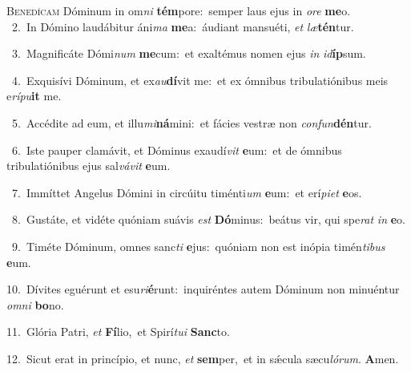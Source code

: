 \lettrine{\initial\textcolor{\initialcolor}{B}}{enedícam} Dóminum in om\textit{ni} \textbf{tém}\-pore:~\star semper laus ejus in \textit{o}\-\textit{re} \textbf{me}\-o.\\
{\numbfont\textcolor{\numbcolor}{~2.}}~In Dómino laudábitur áni\textit{ma} \textbf{me}\-a:~\star áudiant mansuéti, \textit{et} \textit{læ}\-\textbf{tén}tur.\par
{\numbfont\textcolor{\numbcolor}{~3.}}~Magnificáte Dómi\textit{num} \textbf{me}\-cum:~\star et exaltémus nomen ejus \textit{in} \textit{id}\-\textbf{íp}sum.\par
{\numbfont\textcolor{\numbcolor}{~4.}}~Exquisívi Dóminum, et ex\-\textit{au}\-\textbf{dí}vit me:~\star et ex ómnibus tribulatiónibus meis e\-\textit{rí}\-\textit{pu}\textbf{it} me.\par
{\numbfont\textcolor{\numbcolor}{~5.}}~Accédite ad eum, et illu\-\textit{mi}\-\textbf{ná}mini:~\star et fácies vestræ non \textit{con}\-\textit{fun}\textbf{dén}tur.\par
{\numbfont\textcolor{\numbcolor}{~6.}}~Iste pauper clamávit, et Dóminus exaudí\textit{vit} \textbf{e}\-um:~\star et de ómnibus tribulatiónibus ejus sal\-\textit{vá}\-\textit{vit} \textbf{e}\-um.\par
{\numbfont\textcolor{\numbcolor}{~7.}}~Immíttet Angelus Dómini in circúitu timénti\textit{um} \textbf{e}\-um:~\star et erí\-\textit{pi}\-\textit{et} \textbf{e}\-os.\par
{\numbfont\textcolor{\numbcolor}{~8.}}~Gustáte, et vidéte quóniam suávis \textit{est} \textbf{Dó}\-minus:~\star beátus vir, qui spe\textit{rat} \textit{in} \textbf{e}\-o.\par
{\numbfont\textcolor{\numbcolor}{~9.}}~Timéte Dóminum, omnes sanc\textit{ti} \textbf{e}\-jus:~\star quóniam non est inópia timén\-\textit{ti}\-\textit{bus} \textbf{e}\-um.\par
{\numbfont\textcolor{\numbcolor}{10.}}~Dívites eguérunt et esu\-\textit{ri}\-\textbf{é}runt:~\star inquiréntes autem Dóminum non minuéntur \textit{om}\-\textit{ni} \textbf{bo}\-no.\par
{\numbfont\textcolor{\numbcolor}{11.}}~Glória Patri, \textit{et} \textbf{Fí}\-lio,~\star et Spirí\-\textit{tu}\-\textit{i} \textbf{Sanc}\-to.\par
{\numbfont\textcolor{\numbcolor}{12.}}~Sicut erat in princípio, et nunc, \textit{et} \textbf{sem}\-per,~\star et in sǽcula sæcu\-\textit{ló}\-\textit{rum}. \textbf{A}\-men.\par
